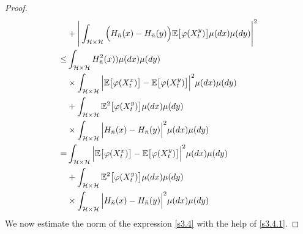 \documentclass[review, onefignum, onetabnum]{siamart171218}
\begin{document}
\begin{proof}
\begin{equation}
\begin{aligned}
            &+
            \Bigg|
                \int_{\mathcal{H}
                \times 
                \mathcal{H}
                } 
                \Big(
                    H_{\bar n}(x) - H_{\bar n}(y)
                \Big) 
                \mathbb{E}\big[
                    \varphi(X_t ^ y)
                \big] 
                \mu(dx)\mu(dy)
            \Bigg|^2 
            \\
            \le & 
            \int_{\mathcal{H}\times \mathcal{H}} 
                H_{\bar n}^2(x)) 
            \mu(dx)\mu(dy)
            \\
            &\times
                \int_{\mathcal{H}\times \mathcal{H}} 
                \Big|
                    \mathbb{E}\big [
                        \varphi(X_t^x)
                    \big]
                    -
                    \mathbb{E}\big[
                        \varphi(X_t^y)
                    \big] 
                \Big|^2 
                \mu(dx)\mu(dy)
            \\
            &+
            \int_{\mathcal{H} \times \mathcal{H}} 
                \mathbb{E}^2\big[
                    \varphi(X_t^y)
                \big] 
            \mu(dx)\mu(dy)
            \\
             &\times
            \int_{\mathcal{H}\times \mathcal{H}} 
            \Big|
                H_{\bar n}(x)-H_{\bar n}(y)
            \Big|^2
            \mu(dx)\mu(dy)
            \\
            =& 
            \int_{\mathcal{H}\times \mathcal{H}}
                \Big| 
                    \mathbb{E}\big [
                        \varphi(X_t^x)
                    \big]
                    -
                    \mathbb{E}\big[
                        \varphi(X_t^y)
                    \big] 
                \Big|^2 
                \mu(dx) \mu(dy) 
            \\
            &+ 
            \int_{\mathcal{H}\times \mathcal{H}} 
                \mathbb{E}^2\big[
                    \varphi(X_t^y)
                \big] 
            \mu(dx)\mu(dy)
            \\
            & \times
            \int_{\mathcal{H}\times \mathcal{H}} 
                \Big|
                    H_{\bar n}(x)
                    -
                    H_{\bar n}(y)
                \Big|^2  
            \mu(dx)\mu(dy)
    \end{aligned}
\end{equation}
We now estimate the norm of the expression \eqref{s3.4} with the help of 
\eqref{s3.4.1}.


\end{proof}
\end{document}
